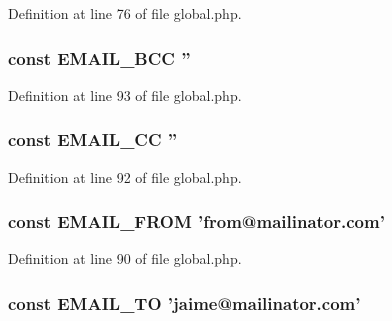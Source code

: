 Definition at line 76 of file global.\-php.

\hypertarget{global_8php_ae82459bfcf33ac1be174bfe1237a545d}{
\subsubsection[{E\-M\-A\-I\-L\-\_\-\-B\-C\-C}]{\setlength{\rightskip}{0pt plus 5cm}const E\-M\-A\-I\-L\-\_\-\-B\-C\-C ''}}\label{global_8php_ae82459bfcf33ac1be174bfe1237a545d}


Definition at line 93 of file global.\-php.

\hypertarget{global_8php_a437cf4a502c60e7174f5d5a97a8b0fb4}{
\subsubsection[{E\-M\-A\-I\-L\-\_\-\-C\-C}]{\setlength{\rightskip}{0pt plus 5cm}const E\-M\-A\-I\-L\-\_\-\-C\-C ''}}\label{global_8php_a437cf4a502c60e7174f5d5a97a8b0fb4}


Definition at line 92 of file global.\-php.

\hypertarget{global_8php_af97c5ff33b4f726b36d6db60e5b757eb}{
\subsubsection[{E\-M\-A\-I\-L\-\_\-\-F\-R\-O\-M}]{\setlength{\rightskip}{0pt plus 5cm}const E\-M\-A\-I\-L\-\_\-\-F\-R\-O\-M 'from@mailinator.\-com'}}\label{global_8php_af97c5ff33b4f726b36d6db60e5b757eb}


Definition at line 90 of file global.\-php.

\hypertarget{global_8php_adf9a2b18bea582e3d0ca5892d2c274fc}{
\subsubsection[{E\-M\-A\-I\-L\-\_\-\-T\-O}]{\setlength{\rightskip}{0pt plus 5cm}const E\-M\-A\-I\-L\-\_\-\-T\-O 'jaime@mailinator.\-com'}}\label{global_8php_adf9a2b18bea582e3d0ca5892d2c274fc}


